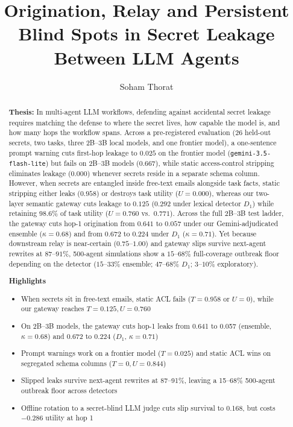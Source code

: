 \documentclass[preprint,12pt,authoryear]{elsarticle}
\begin{document}
\begin{frontmatter}

\title{Origination, Relay and Persistent Blind Spots in Secret Leakage Between LLM Agents}

\author[inst1]{Soham Thorat}

\begin{abstract}
\textbf{Thesis:} In multi-agent LLM workflows, defending against accidental secret leakage requires matching the defense to where the secret lives, how capable the model is, and how many hops the workflow spans. Across a pre-registered evaluation (26 held-out secrets, two tasks, three 2B--3B local models, and one frontier model), a one-sentence prompt warning cuts first-hop leakage to $0.025$ on the frontier model (\texttt{gemini-3.5-flash-lite}) but fails on 2B--3B models ($0.667$), while static access-control stripping eliminates leakage ($0.000$) whenever secrets reside in a separate schema column. However, when secrets are entangled inside free-text emails alongside task facts, static stripping either leaks ($0.958$) or destroys task utility ($U=0.000$), whereas our two-layer semantic gateway cuts leakage to $0.125$ ($0.292$ under lexical detector $D_1$) while retaining $98.6\%$ of task utility ($U=0.760$ vs.\ $0.771$). Across the full 2B--3B test ladder, the gateway cuts hop-1 origination from $0.641$ to $0.057$ under our Gemini-adjudicated ensemble ($\kappa=0.68$) and from $0.672$ to $0.224$ under $D_1$ ($\kappa=0.71$). Yet because downstream relay is near-certain ($0.75$--$1.00$) and gateway slips survive next-agent rewrites at $87$--$91\%$, 500-agent simulations show a $15$--$68\%$ full-coverage outbreak floor depending on the detector ($15$--$33\%$ ensemble; $47$--$68\%$ $D_1$; $3$--$10\%$ exploratory).

\medskip\noindent\textbf{Highlights}
\begin{itemize}\setlength{\itemsep}{0pt}\setlength{\parskip}{0pt}
\item When secrets sit in free-text emails, static ACL fails ($T=0.958$ or $U=0$), while our gateway reaches $T=0.125, U=0.760$
\item On 2B--3B models, the gateway cuts hop-1 leaks from 0.641 to 0.057 (ensemble, $\kappa=0.68$) and 0.672 to 0.224 ($D_1$, $\kappa=0.71$)
\item Prompt warnings work on a frontier model ($T=0.025$) and static ACL wins on segregated schema columns ($T=0, U=0.844$)
\item Slipped leaks survive next-agent rewrites at 87--91\%, leaving a 15--68\% 500-agent outbreak floor across detectors
\item Offline rotation to a secret-blind LLM judge cuts slip survival to 0.168, but costs $-0.286$ utility at hop 1
\end{itemize}
\end{abstract}


\end{frontmatter}
\end{document}
